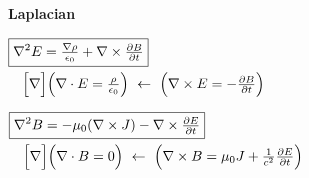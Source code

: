 \documentclass[12pt]{article}
\begin{document}
\vfill
\textbf{Laplacian}\\[10pt]
\begin{minipage}[t]{.48\textwidth}
	\(\begin{aligned}
		& \boxed{ \nabla^2 E = \tfrac{\nabla \rho}{\epsilon_0} + \nabla \times \tfrac{\partial B}{\partial t} }\\
		& \hspace{10pt} \Bigl[ \nabla \Bigr] \Bigl( \nabla \cdot E = \tfrac{\rho}{\epsilon_0} \Bigr)
			\ \leftarrow\ \Bigl( \nabla \times E = - \tfrac{\partial B}{\partial t} \Bigr)
	\end{aligned}\)
\end{minipage}
\hfill
\begin{minipage}[t]{.48\textwidth}
	\(\begin{aligned}
		& \boxed{ \nabla^2 B = - \mu_0 (\nabla \times J) - \nabla \times \tfrac{\partial E}{\partial t} }\\
		& \hspace{10pt} \Bigl[ \nabla \Bigr] \Bigl( \nabla \cdot B = 0 \Bigr)
			\ \leftarrow\ \Bigl( \nabla \times B = \mu_0 J + \tfrac{1}{c^2} \tfrac{\partial E}{\partial t} \Bigr)
	\end{aligned}\)
\end{minipage}
\end{document}
